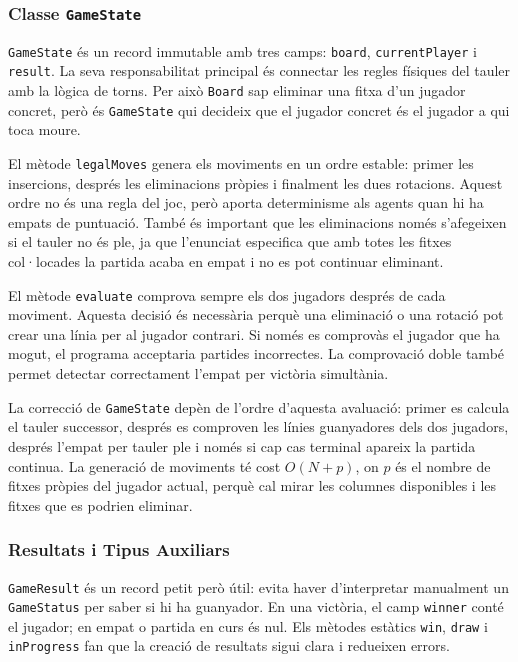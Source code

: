 \documentclass[conference,compsoc]{IEEEtran}
\begin{document}
\subsubsection{Classe \texttt{GameState}}

\texttt{GameState} és un record immutable amb tres camps: \texttt{board},
\texttt{currentPlayer} i \texttt{result}. La seva responsabilitat principal és
connectar les regles físiques del tauler amb la lògica de torns. Per això
\texttt{Board} sap eliminar una fitxa d'un jugador concret, però és
\texttt{GameState} qui decideix que el jugador concret és el jugador a qui toca
moure.

El mètode \texttt{legalMoves} genera els moviments en un ordre estable: primer les
insercions, després les eliminacions pròpies i finalment les dues rotacions. Aquest
ordre no és una regla del joc, però aporta determinisme als agents quan hi ha
empats de puntuació. També és important que les eliminacions només s'afegeixen si
el tauler no és ple, ja que l'enunciat especifica que amb totes les fitxes
col·locades la partida acaba en empat i no es pot continuar eliminant.

El mètode \texttt{evaluate} comprova sempre els dos jugadors després de cada
moviment. Aquesta decisió és necessària perquè una eliminació o una rotació pot
crear una línia per al jugador contrari. Si només es comprovàs el jugador que ha
mogut, el programa acceptaria partides incorrectes. La comprovació doble també
permet detectar correctament l'empat per victòria simultània.

La correcció de \texttt{GameState} depèn de l'ordre d'aquesta avaluació: primer es
calcula el tauler successor, després es comproven les línies guanyadores dels dos
jugadors, després l'empat per tauler ple i només si cap cas terminal apareix la
partida continua. La generació de moviments té cost $O(N+p)$, on $p$ és el nombre
de fitxes pròpies del jugador actual, perquè cal mirar les columnes disponibles i
les fitxes que es podrien eliminar.

\subsubsection{Resultats i Tipus Auxiliars}

\texttt{GameResult} és un record petit però útil: evita haver d'interpretar
manualment un \texttt{GameStatus} per saber si hi ha guanyador. En una victòria,
el camp \texttt{winner} conté el jugador; en empat o partida en curs és nul. Els
mètodes estàtics \texttt{win}, \texttt{draw} i \texttt{inProgress} fan que la
creació de resultats sigui clara i redueixen errors.
\end{document}
